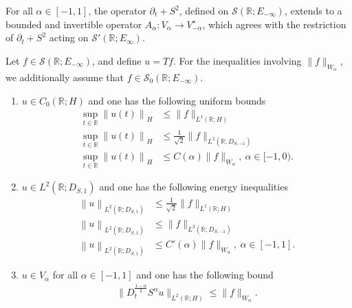 \documentclass[10pt,a4paper]{amsart}
\begin{document}
\begin{thm}\label{ISOMORPHISM}
    For all $\alpha\in [-1,1]$, the operator $ \partial_t + S^2 $, defined on $\mathcal{S}(\mathbb{R};E_{-\infty})$, extends to a bounded and invertible  operator $ A_\alpha :  V_\alpha \rightarrow V_{-\alpha}^\star$, which agrees with the restriction of $\partial_t + S^2$ acting on $\mathcal{S}'(\mathbb{R};E_\infty)$.
\end{thm}

\begin{lem} \label{lem:aprioriestimates} 
Let $ f \in \mathcal{S}(\mathbb{R}; E_{-\infty}) $, and define $ u = Tf $. For the inequalities involving $ \|f\|_{W_\alpha} $, we additionally assume that $ f \in \mathcal{S}_0(\mathbb{R}; E_{-\infty})$. 
    
    \begin{enumerate} \item $u\in C_0(\mathbb{R}; H)$ and one has the following uniform bounds
        \begin{align*}\sup_{t \in \mathbb{R}} \left\| u(t)\right\|_H &\le \|f\|_{L^1(\mathbb{R};H)}\\
            \sup_{t \in \mathbb{R}} \left\| u(t)\right\|_H  &\le \frac{1}{\sqrt{2}} \|f \|_{L^2(\mathbb{R}; D_{S,-1})}\\
            \sup_{t \in \mathbb{R}} \left\| u(t)\right\|_H &\le C(\alpha) \|f\|_{W_\alpha}, \ \alpha\in [-1,0).
        \end{align*} 
        \item  $u \in L^2(\mathbb{R};D_{S,1})$ and one has the following energy inequalities
        \begin{align*}\left\|u \right\|_{L^2(\mathbb{R}; D_{S,1})} &\le \frac{1}{\sqrt{2}} \|f\|_{L^1(\mathbb{R};H)}\\
            \left\|u \right\|_{L^2(\mathbb{R}; D_{S,1})}  &\le  \|f \|_{L^2(\mathbb{R}; D_{S,-1})}\\
            \left\|u \right\|_{L^2(\mathbb{R}; D_{S,1})} &\le C'(\alpha) \|f\|_{W_\alpha}, \ \alpha\in [-1,1].
        \end{align*} 
        \item  $u \in V_\alpha$ for all $\alpha\in [-1,1]$ and one has the following bound
        \begin{align*}\|D_t^{\frac{1-\alpha}{2}}S^\alpha u\|_{L^2(\mathbb{R};H)}  \le  \|f\|_{W_\alpha}.
        \end{align*} 
         
            \end{enumerate}
        
\end{lem}
\end{document}
